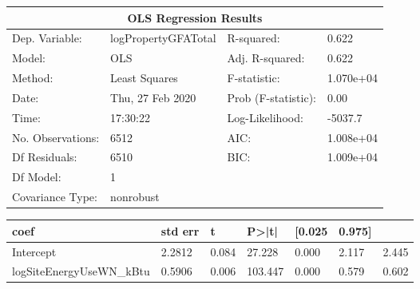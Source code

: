 \begin{table*}[p]
  \centering
\begin{tabular}{@{}llll@{}}
\toprule
\multicolumn{4}{c}{OLS Regression Results}                                \\ \midrule
Dep. Variable:    & logPropertyGFATotal & R-squared:          & 0.622     \\
Model:            & OLS                 & Adj. R-squared:     & 0.622     \\
Method:           & Least Squares       & F-statistic:        & 1.070e+04 \\
Date:             & Thu, 27 Feb 2020    & Prob (F-statistic): & 0.00      \\
Time:             & 17:30:22            & Log-Likelihood:     & -5037.7   \\
No. Observations: & 6512                & AIC:                & 1.008e+04 \\
Df Residuals:     & 6510                & BIC:                & 1.009e+04 \\
Df Model:         & 1                   &                     &           \\
Covariance Type:  & nonrobust           &                     &           \\ \bottomrule
\end{tabular}
\end{table*}

\begin{table*}[p]
  \centering
\begin{tabular}{@{}lllllll@{}}
\toprule
coef                     & std err & t     & P\textgreater{}|t| & {[}0.025 & 0.975{]} &       \\ \midrule
Intercept                & 2.2812  & 0.084 & 27.228             & 0.000    & 2.117    & 2.445 \\
logSiteEnergyUseWN\_kBtu & 0.5906  & 0.006 & 103.447            & 0.000    & 0.579    & 0.602 \\ \bottomrule
\end{tabular}
\end{table*}
